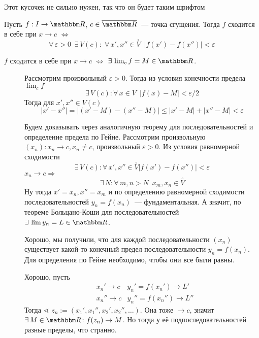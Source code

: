 \documentclass[12pt]{../../notes}
\begin{document}
Этот кусочек не сильно нужен, так что он будет {\footnotesize таким шрифтом}
\begin{footnotesize}

\begin{defn}
  Пусть $f: I \to \R$, $c\in \overline{\R}$~--- точка сгущения. Тогда $f$ сходится в себе при $x\to c$
  $\Leftrightarrow$
  \[
    \forall\, \varepsilon > 0 \;\: \exists\, V(c) \colon \; \forall\,x', x'' \in \overset{\circ} V 
    \;\: |f(x') - f(x'')| < \varepsilon
  \]
\end{defn}

\begin{thrm}\label{thrm:bkfun}
  $f$ сходится в себе при $x\to c$ $\Leftrightarrow$ $\exists\,\lim_c f = M \in \R$.
\end{thrm}
\begin{ittproof}
  \begin{description}
    \item[\circlearound{$\Leftarrow$}]  Рассмотрим произвольный $\varepsilon > 0$. Тогда из условия конечности
      предела $\lim_c f$
      \[
        \exists\, V(c) \colon \forall\, x \in V \;\: | f(x) - M | < \varepsilon/2
      \]
      Тогда для $x',x'' \in V(c)$ 
      \[
        |x' - x''| = |(x' - M) - (x''- M)| \leqslant |x' - M| + |x'' - M| < \varepsilon 
      \]
    \item[\circlearound{$\Rightarrow$}] Будем доказывать через аналогичную теорему для последовательностей
      и определение предела по Гейне. Рассмотрим произвольную $(x_n)\colon x_n \to c, x_n \neq c$, 
      произвольный $\varepsilon > 0$.
      Из условия равномерной сходимости
      \[
        \exists\, V(c) \colon \forall\, x', x'' \in \overset{\circ}{V} |f(x') - f(x'')| < \varepsilon
      \]
      $x_n \to c \Rightarrow$
      \[
        \exists\, N \colon \forall\, m,n > N \;\: x_m, x_n \in \overset{\circ}{V}
      \]
      Ну тогда $x' = x_n, x'' = x_m$ и по определению равномерной сходимости последовательностей 
      $y_n = f(x_n)$~--- фундаментальная. А значит, по теореме Больцано-Коши для последовательностей
      $\exists\, \lim y_n = L \in \R$.

      Хорошо, мы получили, что для каждой последовательности $(x_n)$ существует какой-то конечный предел 
      последовательности $y_n = f(x_n)$. Для определения по Гейне необходимо, чтобы они все были равны.

      Хорошо, пусть
      \begin{align*}
        &x_n' \to c  & y_n' = f(x_n') \to L' \\
        &x_n'' \to c  & y_n'' = f(x_n'') \to L''
      \end{align*}
      Тогда $\sphericalangle$ $z_n := (x_1', x_1'', x_2', x_2'', \dotsc)$. Она тоже $\to c$, 
      значит $\exists\, M \in \R\colon f(z_n) \to M$. 
      Но тогда у её подпоследовательностей разные пределы, что странно. 
  \end{description}
\end{ittproof}
\end{footnotesize}
\end{document}

